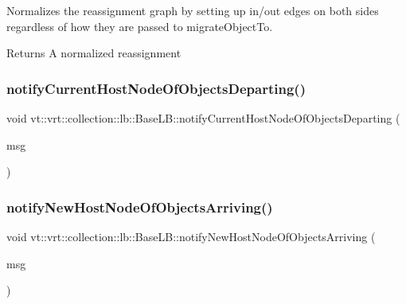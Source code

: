 Normalizes the reassignment graph by setting up in/out edges on both sides regardless of how they are passed to {\ttfamily migrate\+Object\+To}. 

\begin{DoxyReturn}{Returns}
A normalized reassignment 
\end{DoxyReturn}
\mbox{\label{structvt_1_1vrt_1_1collection_1_1lb_1_1_base_l_b_a0f3cd0272069ff5fb31d6539c567efeb}} 
\subsubsection{\texorpdfstring{notify\+Current\+Host\+Node\+Of\+Objects\+Departing()}{notifyCurrentHostNodeOfObjectsDeparting()}}
{\footnotesize\ttfamily void vt\+::vrt\+::collection\+::lb\+::\+Base\+L\+B\+::notify\+Current\+Host\+Node\+Of\+Objects\+Departing (\begin{DoxyParamCaption}\item[{\hyperlink{structvt_1_1vrt_1_1collection_1_1lb_1_1_transfer_msg}{Transfer\+Msg}$<$ \hyperlink{structvt_1_1vrt_1_1collection_1_1lb_1_1_base_l_b_ad50ba1022c6beeb6e9187a8f1a3e16fe}{Obj\+Destination\+List\+Type} $>$ $\ast$}]{msg }\end{DoxyParamCaption})}

\mbox{\label{structvt_1_1vrt_1_1collection_1_1lb_1_1_base_l_b_a2bab9ccb4d2378b3915b03c79d5b18c2}} 
\subsubsection{\texorpdfstring{notify\+New\+Host\+Node\+Of\+Objects\+Arriving()}{notifyNewHostNodeOfObjectsArriving()}}
{\footnotesize\ttfamily void vt\+::vrt\+::collection\+::lb\+::\+Base\+L\+B\+::notify\+New\+Host\+Node\+Of\+Objects\+Arriving (\begin{DoxyParamCaption}\item[{\hyperlink{structvt_1_1vrt_1_1collection_1_1lb_1_1_transfer_msg}{Transfer\+Msg}$<$ \hyperlink{structvt_1_1vrt_1_1collection_1_1lb_1_1_base_l_b_ab19ea4bb93a63cd22645cc03a58651f1}{Obj\+Load\+List\+Type} $>$ $\ast$}]{msg }\end{DoxyParamCaption})}

